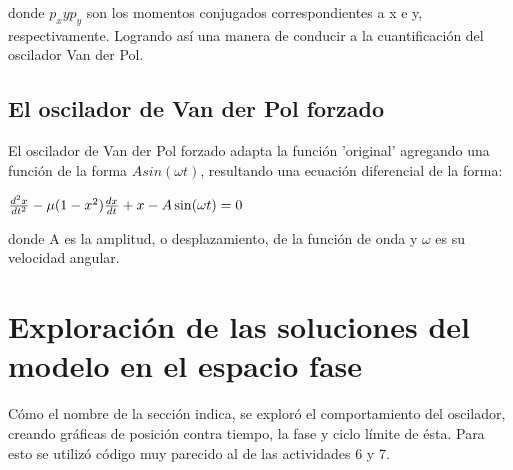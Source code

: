 \documentclass{article}
\begin{document}
donde $p_{x} y p_{y}$ son los momentos conjugados correspondientes a x e y, respectivamente. Logrando así una manera de conducir a la cuantificación del oscilador Van der Pol.

\subsection{El oscilador de Van der Pol forzado}
El oscilador de Van der Pol forzado adapta la función 'original' agregando una función de la forma $Asin (\omega t)$, resultando una ecuación diferencial de la forma:
\begin{center}
${d^2x \over dt^2}-\mu(1-x^2){dx \over dt}+x-A \sin(\omega t)= 0$
\end{center}
donde A es la amplitud, o desplazamiento, de la función de onda y $\omega$ es su velocidad angular.
\section{Exploración de las soluciones del modelo en el espacio fase}
Cómo el nombre de la sección indica, se exploró el comportamiento del oscilador, creando gráficas de posición contra tiempo, la fase y ciclo límite de ésta. Para esto se utilizó código muy parecido al de las actividades 6 y 7.
\end{document}
